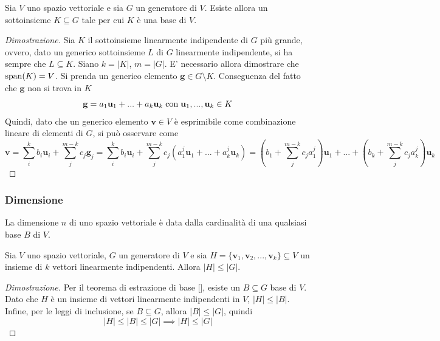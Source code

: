     \vspace{10pt}
    \begin{theorem} \label{thm:basis_extraction}
        Sia $V$ uno spazio vettoriale e sia $G$ un generatore di $V$. Esiste allora un sottoinsieme $K \subseteq G$ tale per cui $K$ è una base di $V$.
    \end{theorem}
    \begin{proof}[Dimostrazione]
        Sia $K$ il sottoinsieme linearmente indipendente di $G$ più grande, ovvero, dato un generico sottoinsieme $L$ di $G$ linearmente indipendente, si ha sempre che $L \subseteq K$. Siano $k = |K|$, $m = |G|$.
        E' necessario allora dimostrare che $\textnormal{span}(K) = V$. Si prenda un generico elemento $\mathbf{g} \in G \setminus K$. Conseguenza del fatto che $\mathbf{g}$ non si trova in $K$
        \[
            \mathbf{g} = a_1 \mathbf{u}_{1} + ... + a_k \mathbf{u}_{k} \; \textnormal{con} \; \mathbf{u}_{1}, ..., \mathbf{u}_{k} \in K
        \]
        Quindi, dato che un generico elemento $\mathbf{v} \in V$ è esprimibile come combinazione lineare di elementi di $G$, si può osservare come
        \[
            \mathbf{v} = \sum_{i}^{k} b_i \mathbf{u}_{i} + \sum_{j}^{m - k} c_j \mathbf{g}_{j} = \sum_{i}^{k} b_i \mathbf{u}_{i} + \sum_{j}^{m - k} c_j (a_{1}^{j} \mathbf{u}_{1} + ... + a_{k}^{j} \mathbf{u}_{k}) = (b_1 + \sum_{j}^{m-k} c_j a_{1}^{j}) \mathbf{u}_{1} + ... + (b_k + \sum_{j}^{m-k} c_j a_{k}^{j}) \mathbf{u}_{k}
        \]
    \end{proof}

    \subsubsection{Dimensione}
    La dimensione $n$ di uno spazio vettoriale è data dalla cardinalità di una qualsiasi base $B$ di $V$.

    \begin{lemma}
        Sia $V$ uno spazio vettoriale, $G$ un generatore di $V$ e sia $H = \{\mathbf{v}_1, \mathbf{v}_2, ..., \mathbf{v}_k\} \subseteq V$ un insieme di $k$ vettori linearmente indipendenti.
        Allora $|H| \leq |G|$.
    \end{lemma}

    \begin{proof}[Dimostrazione]
        Per il teorema di estrazione di base [], esiste un $B \subseteq G$ base di $V$. Dato che $H$ è un insieme di vettori linearmente indipendenti in $V$, $|H| \leq |B|$.
        Infine, per le leggi di inclusione, se $B \subseteq G$, allora $|B| \leq |G|$, quindi
        \[
            |H| \leq |B| \leq |G| \implies |H| \leq |G|
        \]
    \end{proof}

